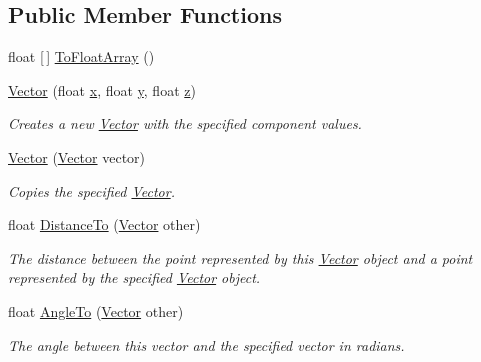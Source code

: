 \subsection*{Public Member Functions}
\begin{DoxyCompactItemize}
\item 
float \mbox{[}$\,$\mbox{]} \mbox{\hyperlink{struct_leap_1_1_vector_ac5cd8263402ee3da54d342c65bde2511}{To\+Float\+Array}} ()
\item 
\mbox{\hyperlink{struct_leap_1_1_vector_a2d4bd80855cf435476d47c378a22ca8d}{Vector}} (float \mbox{\hyperlink{struct_leap_1_1_vector_aa567a19970c776ccb9ebe9a09cb14828}{x}}, float \mbox{\hyperlink{struct_leap_1_1_vector_a458897a143435a1292796d8dfb1d760d}{y}}, float \mbox{\hyperlink{struct_leap_1_1_vector_afd2f32c0771e6e15fcef62f0fbf57658}{z}})
\begin{DoxyCompactList}\small\item\em Creates a new \mbox{\hyperlink{struct_leap_1_1_vector}{Vector}} with the specified component values. \end{DoxyCompactList}\item 
\mbox{\hyperlink{struct_leap_1_1_vector_a1058e5cc80c4eb8f521f485269f7b614}{Vector}} (\mbox{\hyperlink{struct_leap_1_1_vector}{Vector}} vector)
\begin{DoxyCompactList}\small\item\em Copies the specified \mbox{\hyperlink{struct_leap_1_1_vector}{Vector}}. \end{DoxyCompactList}\item 
float \mbox{\hyperlink{struct_leap_1_1_vector_a9a192946523c91fc5aec3541cc09b762}{Distance\+To}} (\mbox{\hyperlink{struct_leap_1_1_vector}{Vector}} other)
\begin{DoxyCompactList}\small\item\em The distance between the point represented by this \mbox{\hyperlink{struct_leap_1_1_vector}{Vector}} object and a point represented by the specified \mbox{\hyperlink{struct_leap_1_1_vector}{Vector}} object. \end{DoxyCompactList}\item 
float \mbox{\hyperlink{struct_leap_1_1_vector_a5833741990af0c182a41c75053d628b7}{Angle\+To}} (\mbox{\hyperlink{struct_leap_1_1_vector}{Vector}} other)
\begin{DoxyCompactList}\small\item\em The angle between this vector and the specified vector in radians. \end{DoxyCompactList}\item 

\end{DoxyCompactItemize}
